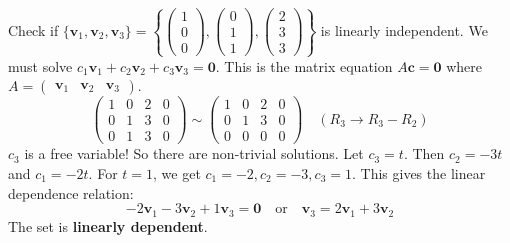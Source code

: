 \begin{example}
Check if $\{\mathbf{v}_1, \mathbf{v}_2, \mathbf{v}_3\} = \left\{ \begin{pmatrix} 1 \\ 0 \\ 0 \end{pmatrix}, \begin{pmatrix} 0 \\ 1 \\ 1 \end{pmatrix}, \begin{pmatrix} 2 \\ 3 \\ 3 \end{pmatrix} \right\}$ is linearly independent.
We must solve $c_1\mathbf{v}_1 + c_2\mathbf{v}_2 + c_3\mathbf{v}_3 = \mathbf{0}$.
This is the matrix equation $A\mathbf{c} = \mathbf{0}$ where $A = \begin{pmatrix} \mathbf{v}_1 & \mathbf{v}_2 & \mathbf{v}_3 \end{pmatrix}$.
\[ \left(\begin{array}{ccc|c} 1 & 0 & 2 & 0 \\ 0 & 1 & 3 & 0 \\ 0 & 1 & 3 & 0 \end{array}\right) \sim \left(\begin{array}{ccc|c} 1 & 0 & 2 & 0 \\ 0 & 1 & 3 & 0 \\ 0 & 0 & 0 & 0 \end{array}\right) \quad (R_3 \to R_3 - R_2) \]
$c_3$ is a free variable! So there are non-trivial solutions.
Let $c_3 = t$. Then $c_2 = -3t$ and $c_1 = -2t$.
For $t=1$, we get $c_1 = -2, c_2 = -3, c_3 = 1$.
This gives the linear dependence relation:
\[ -2\mathbf{v}_1 - 3\mathbf{v}_2 + 1\mathbf{v}_3 = \mathbf{0} \quad \text{or} \quad \mathbf{v}_3 = 2\mathbf{v}_1 + 3\mathbf{v}_2 \]
The set is \textbf{linearly dependent}.
\end{example}

